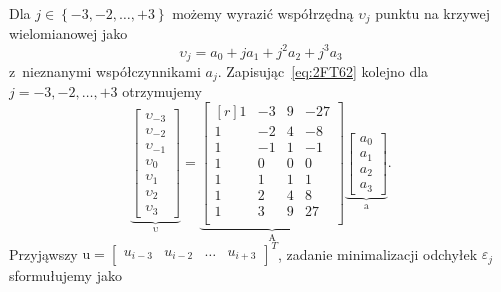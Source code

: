 \documentclass[paper=a4,DIV=12]{tmmlab}
\newcommand{\brm}[1]{\bm{\mathrm{#1}}}
\begin{document}
\begin{appendices}
  Dla $j \in \left\lbrace -3,-2,\dots,+3 \right\rbrace$ możemy wyrazić
  współrzędną $\upsilon_j$ punktu na krzywej wielomianowej jako
  \begin{equation}
    \upsilon_j = a_0 + j a_1 + j^2 a_2 + j^3 a_3
    \label{eq:2FT62}
  \end{equation}
  z~nieznanymi współczynnikami $a_j$. Zapisując~\eqref{eq:2FT62} kolejno dla
  $j=-3, -2, \dots, +3$ otrzymujemy
  \begin{equation}
    \underbrace{\begin{bmatrix}
      \upsilon_{-3} \\ \upsilon_{-2} \\ \upsilon_{-1}
      \\ \upsilon_0 \\
      \upsilon_{1} \\ \upsilon_{2} \\ \upsilon_{3}
    \end{bmatrix}}_{\brm{\upsilon}}
    =
    \underbrace{\begin{bmatrix*}[r]
        1 & -3 & 9 & -27 \\
        1 & -2 & 4 &  -8 \\
        1 & -1 & 1 &  -1 \\
        1 &  0 & 0 &   0 \\
        1 &  1 & 1 &   1 \\
        1 &  2 & 4 &   8 \\
        1 &  3 & 9 &  27 \\
    \end{bmatrix*}}_{\brm{A}}
    \underbrace{\begin{bmatrix}
      a_0 \\ a_1 \\ a_2 \\ a_3
    \end{bmatrix}}_{\brm{a}}.
    \label{eq:QGBG1}
  \end{equation}
  Przyjąwszy $\brm{u} = \begin{bmatrix} u_{i-3} & u_{i-2} & \dots & u_{i+3}
  \end{bmatrix}^T$, zadanie minimalizacji odchyłek $\varepsilon_j$ sformułujemy
  jako

\end{appendices}
\end{document}
